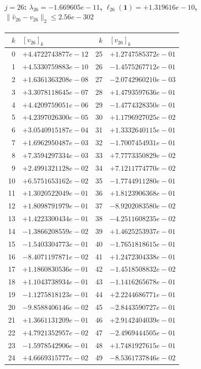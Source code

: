 \paragraph{$j = 26$: $\lambda_{26} = -1.669605e-11$, \quad $\ell_{26}(\mathbf{1}) = +1.319616e-10$, \quad $\|\hat{v}_{26} - v_{26}\|_2 \leq 2.56e-302$}
\begin{center}
{\footnotesize
\begin{tabular}{r@{\;\;}l@{\quad}r@{\;\;}l}
\toprule
$k$ & $[v_{26}]_k$ & $k$ & $[v_{26}]_k$ \\
\midrule
0 & $+4.4722743877e-12$ & 25 & $+1.2747585372e-01$ \\
1 & $+4.5330759883e-10$ & 26 & $-1.4575267712e-01$ \\
2 & $+1.6361363208e-08$ & 27 & $-2.0742960210e-03$ \\
3 & $+3.3078118645e-07$ & 28 & $+1.4793597636e-01$ \\
4 & $+4.4209759051e-06$ & 29 & $-1.4774328350e-01$ \\
5 & $+4.2397026300e-05$ & 30 & $+1.1796927025e-02$ \\
6 & $+3.0540915187e-04$ & 31 & $+1.3332640115e-01$ \\
7 & $+1.6962950487e-03$ & 32 & $-1.7007454931e-01$ \\
8 & $+7.3594297334e-03$ & 33 & $+7.7773350829e-02$ \\
9 & $+2.4991321128e-02$ & 34 & $+7.1211774770e-02$ \\
10 & $+6.5751653162e-02$ & 35 & $-1.7744911280e-01$ \\
11 & $+1.3020522049e-01$ & 36 & $+1.8123906368e-01$ \\
12 & $+1.8098791979e-01$ & 37 & $-8.9202083580e-02$ \\
13 & $+1.4223300434e-01$ & 38 & $-4.2511608235e-02$ \\
14 & $-1.3866208559e-02$ & 39 & $+1.4625253937e-01$ \\
15 & $-1.5403304773e-01$ & 40 & $-1.7651818615e-01$ \\
16 & $-8.4071197871e-02$ & 41 & $+1.2472304338e-01$ \\
17 & $+1.1860830536e-01$ & 42 & $-1.4518508832e-02$ \\
18 & $+1.1043738934e-01$ & 43 & $-1.1416265678e-01$ \\
19 & $-1.1275818123e-01$ & 44 & $+2.2244686771e-01$ \\
20 & $-9.8588406146e-02$ & 45 & $-2.8443590727e-01$ \\
21 & $+1.3661131209e-01$ & 46 & $+2.9142404039e-01$ \\
22 & $+4.7921352957e-02$ & 47 & $-2.4969444505e-01$ \\
23 & $-1.5978542906e-01$ & 48 & $+1.7481927615e-01$ \\
24 & $+4.6669315777e-02$ & 49 & $-8.5361737846e-02$ \\
\bottomrule
\end{tabular}
}
\end{center}

